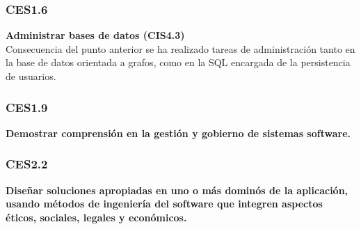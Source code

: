 \subsubsection{CES1.6}
\textbf{Administrar bases de datos (CIS4.3)}\\
Consecuencia del punto anterior se ha realizado tareas de administración tanto en la base de datos orientada a grafos, como en la SQL encargada de la persistencia de usuarios.

\subsubsection{CES1.9}
\textbf{Demostrar comprensión en la gestión y gobierno de sistemas software.}\\

\subsubsection{CES2.2}
\textbf{Diseñar soluciones apropiadas en uno o más dominós de la aplicación, usando métodos de ingeniería del software que integren aspectos éticos, sociales, legales y económicos.}\\


